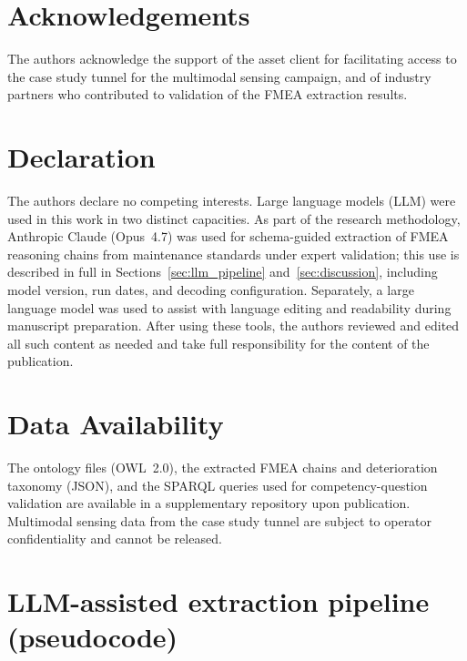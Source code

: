 \documentclass[11pt,a4paper]{article}
\begin{document}
\section*{Acknowledgements}
The authors acknowledge the support of the asset client for facilitating access to the case study
tunnel for the multimodal sensing campaign, and of industry
partners who contributed to validation of the FMEA extraction
results.

\section*{Declaration}
The authors declare no competing interests.
Large language models (LLM) were used in this work in two distinct capacities. As part of the research methodology, Anthropic Claude (Opus~4.7) was used for schema-guided extraction of FMEA reasoning chains from maintenance standards under expert validation; this use is described in full in Sections~\ref{sec:llm_pipeline} and~\ref{sec:discussion}, including model version, run dates, and decoding configuration. Separately, a large language model was used to assist with language editing and readability during manuscript preparation. After using these tools, the authors reviewed and edited all such content as needed and take full responsibility for the content of the publication.

\section*{Data Availability}
\label{sec:data_avail}
The ontology files (OWL~2.0), the extracted FMEA chains and deterioration taxonomy (JSON), and the SPARQL queries used for competency-question validation are available in a supplementary repository upon publication. Multimodal sensing data from the case study tunnel are subject to operator confidentiality and cannot be released.





\newpage
\appendix

\section{LLM-assisted extraction pipeline (pseudocode)}
\label{app:llm}
\end{document}
